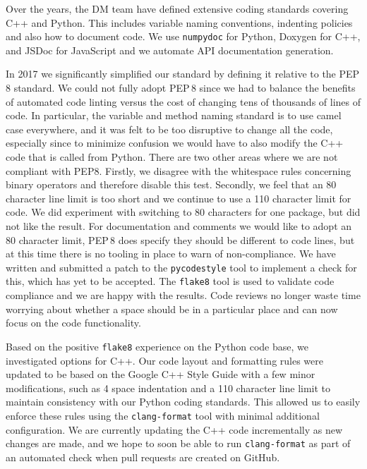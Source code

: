 Over the years, the DM team have defined extensive coding standards\cite{devguide} covering C++ and Python.
This includes variable naming conventions, indenting policies and also how to document code.
We use \texttt{numpydoc}\cite{numpydoc} for Python, Doxygen\cite{doxygen} for C++, and JSDoc\cite{jsdoc} for JavaScript and we automate API documentation generation.

In 2017 we significantly simplified our standard by defining it relative to the PEP\,8 standard\cite{pep8}.
We could not fully adopt PEP\,8 since we had to balance the benefits of automated code linting versus the cost of changing tens of thousands of lines of code.
In particular, the variable and method naming standard is to use camel case everywhere, and it was felt to be too disruptive to change all the code, especially since to minimize confusion we would have to also modify the C++ code that is called from Python.
There are two other areas where we are not compliant with PEP8.
Firstly, we disagree with the whitespace rules concerning binary operators and therefore disable this test.
Secondly, we feel that an 80 character line limit is too short and we continue to use a 110 character limit for code.
We did experiment with switching to 80 characters for one package, but did not like the result.
For documentation and comments we would like to adopt an 80 character limit, PEP\,8 does specify they should be different to code lines, but at this time there is no tooling in place to warn of non-compliance.
We have written and submitted a patch to the \texttt{pycodestyle} tool to implement a check for this, which has yet to be  accepted.
The \texttt{flake8} tool is used to validate code compliance and we are happy with the results.
Code reviews no longer waste time worrying about whether a space should be in a particular place and can now focus on the code functionality.

Based on the positive  \texttt{flake8} experience on the Python code base, we investigated options for C++.
Our code layout and formatting rules were updated to be based on the Google C++ Style Guide\cite{googlestyle} with a few minor modifications, such as 4 space indentation and a 110 character line limit to maintain consistency with our Python coding standards.
This allowed us to easily enforce these rules using the \texttt{clang-format}\cite{clangformat} tool with minimal additional configuration.
We are currently updating the C++ code incrementally as new changes are made, and we hope to soon be able to run \texttt{clang-format} as part of an automated check when pull requests are created on GitHub.

